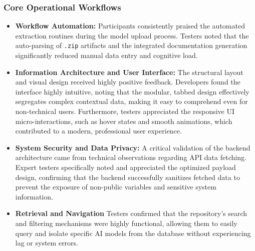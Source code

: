 \documentclass[journal]{./IEEE/IEEEtran}
\begin{document}
\subsubsection{\textbf{Core Operational Workflows}}
\begin{itemize}
    \item \textbf{Workflow Automation:}
    Participants consistently praised the automated extraction routines during the model upload process. Testers noted that the auto-parsing of \texttt{.zip} artifacts and the integrated documentation generation significantly reduced manual data entry and cognitive load.
    \item \textbf{Information Architecture and User Interface:}
    The structural layout and visual design received highly positive feedback. Developers found the interface highly intuitive, noting that the modular, tabbed design effectively segregates complex contextual data, making it easy to comprehend even for non-technical users. Furthermore, testers appreciated the responsive UI micro-interactions, such as hover states and smooth animations, which contributed to a modern, professional user experience.
    \item \textbf{System Security and Data Privacy:}
    A critical validation of the backend architecture came from technical observations regarding API data fetching. Expert testers specifically noted and appreciated the optimized payload design, confirming that the backend successfully sanitizes fetched data to prevent the exposure of non-public variables and sensitive system information.
    \item \textbf{Retrieval and Navigation}
    Testers confirmed that the repository's search and filtering mechanisms were highly functional, allowing them to easily query and isolate specific AI models from the database without experiencing lag or system errors.
\end{itemize}
\end{document}
